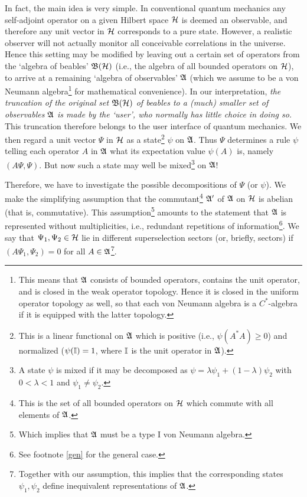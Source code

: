 \documentclass[12pt,titlepage]{article}
\newcommand{\lm}{\lambda}
\newcommand{\ps}{\psi}
\newcommand{\A}{\frak A}
\newcommand{\B}{\frak B}
\renewcommand{\H}{\mbox{$\cal H$}}
\newcommand{\fn}{\footnote}
\begin{document}
In fact, the main idea is very simple. In conventional quantum mechanics any
self-adjoint
operator on a given Hilbert space $\H$ is deemed an observable, and therefore
any unit vector in $\H$
corresponds to a pure state.
However, a realistic observer will not  actually monitor all conceivable
correlations in
the universe. Hence this setting may be modified by leaving out a certain set
of operators
from the `algebra of  beables' $\B(\H)$ (i.e., the algebra of all bounded
operators on $\H$), to
arrive at
 a remaining `algebra of
observables' $\A$ (which we assume to be a von Neumann algebra\fn{This means
that $\A$ consists of
bounded operators, contains the unit operator, and is closed in the weak
operator topology.
Hence it is closed in the uniform operator topology as well, so that each von
Neumann algebra is a
$C^*$-algebra if it is equipped with the latter topology.} for mathematical
convenience).
 In our interpretation, {\em the
truncation of the original set $\B(\H)$ of beables to a (much) smaller set of
observables $\A$
is
made by  the `user', who normally has little choice in doing so.} This
truncation therefore belongs to
the user interface of quantum mechanics.
 We then regard  a unit vector $\Psi$  in $\H$ as a state\fn{This is a linear
functional on $\A$
which is positive (i.e., $\ps(A^*A)\geq 0$) and normalized ($\ps({\Bbb I})=1$,
where $\Bbb I$ is the
unit operator in $\A$).}
 $\ps$ on $\A$.  Thus $\Psi$ determines a rule   $\psi$  telling each operator
$A$ in $\A$ what its expectation value $\psi(A)$ is, namely  $(A\Psi,\Psi)$.
But now such a state may
well be mixed\fn{A state $\ps$ is mixed if it may be decomposed as
$\ps=\lm\ps_1+(1-\lm)\ps_2$ with
$0<\lm<1$ and $\psi_1\neq \psi_2$.} on $\A$!

Therefore, we have to investigate the possible decompositions of $\Psi$ (or
$\ps$).
We make the simplifying assumption that the commutant\fn{This is the set of all
bounded operators on $\H$ which commute with all elements of $\A$.}
 $\A'$ of $\A$ on $\H$ is abelian (that is,
commutative).
This assumption\fn{Which implies that $\A$ must be a type I von Neumann
algebra.} amounts to the
statement that $\A$ is represented without multiplicities, i.e., redundant
repetitions of
information\fn{See footnote \ref{gen} for the general case.}.
 We say that $\Psi_1,\Psi_2\in\H$ lie in different superselection sectors (or,
briefly,
sectors) if $(A\Psi_1,\Psi_2)=0$ for all $A\in\A$\fn{Together with our
assumption, this implies
that the corresponding states $\ps_1,\ps_2$ define inequivalent representations
of $\A$.}.
\end{document}
